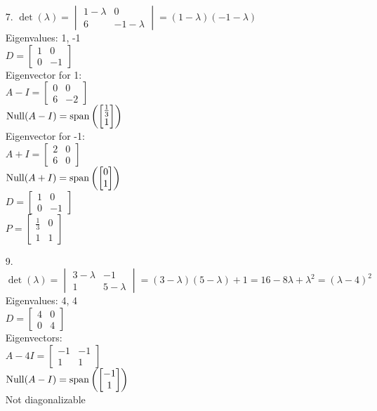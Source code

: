 \documentclass[leqno]{article}
\begin{document}
\begin{enumerate}
    \item[7.]
    $\det(\lambda) = \begin{vmatrix}1-\lambda & 0 \\ 6 & -1-\lambda\end{vmatrix} = (1 - \lambda)(-1 - \lambda)$\\
    Eigenvalues: 1, -1\\
    $D = \begin{bmatrix}1 & 0 \\ 0 & -1\end{bmatrix}$\\
    Eigenvector for 1:\\
    $A - I = \begin{bmatrix}0 & 0\\6 & -2\end{bmatrix}$\\
    $\operatorname{Null}(A - I) = \mathrm{span}\left(\begin{bmatrix}\frac1 3\\ 1\end{bmatrix}\right)$\\
    Eigenvector for -1:\\
    $A + I = \begin{bmatrix}2 & 0\\6 & 0\end{bmatrix}$\\
    $\operatorname{Null}(A + I) = \mathrm{span}\left(\begin{bmatrix}0\\ 1\end{bmatrix}\right)$\\
    $D = \begin{bmatrix}1 & 0\\0 & -1\end{bmatrix}$\\
    $P = \begin{bmatrix}\frac 1 3 & 0\\1 & 1\end{bmatrix}$

    \item[9.]
    $\det(\lambda) = \begin{vmatrix}3-\lambda & -1 \\ 1 & 5-\lambda\end{vmatrix} = (3 - \lambda)(5 - \lambda) + 1 = 16 - 8\lambda + \lambda^2 = (\lambda - 4)^2$\\
    Eigenvalues: 4, 4\\
    $D = \begin{bmatrix}4 & 0 \\ 0 & 4\end{bmatrix}$\\
    Eigenvectors:\\
    $A - 4I = \begin{bmatrix}-1 & -1\\1 & 1\end{bmatrix}$\\
    $\operatorname{Null}(A - I) = \mathrm{span}\left(\begin{bmatrix}-1\\ 1\end{bmatrix}\right)$\\
    Not diagonalizable
    

\end{enumerate}
\end{document}
